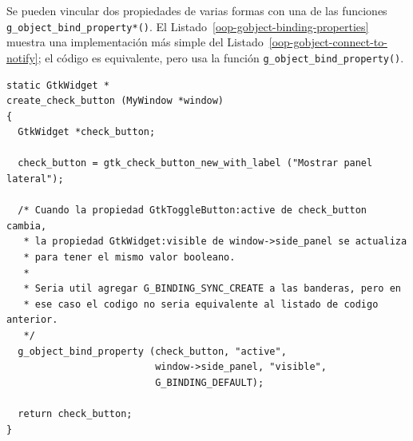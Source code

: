 Se pueden vincular dos propiedades de varias formas con una de las funciones \lstinline{g_object_bind_property*()}. El Listado~\ref{oop-gobject-binding-properties} muestra una implementación más simple del Listado~\ref{oop-gobject-connect-to-notify}; el código es equivalente, pero usa la función \lstinline{g_object_bind_property()}.

\vspace{0.7cm}
\begin{lstlisting}[style=GLib/GTK, caption={Vinculando dos propiedades.}, label=oop-gobject-binding-properties]
static GtkWidget *
create_check_button (MyWindow *window)
{
  GtkWidget *check_button;

  check_button = gtk_check_button_new_with_label ("Mostrar panel lateral");

  /* Cuando la propiedad GtkToggleButton:active de check_button cambia,
   * la propiedad GtkWidget:visible de window->side_panel se actualiza
   * para tener el mismo valor booleano.
   *
   * Seria util agregar G_BINDING_SYNC_CREATE a las banderas, pero en
   * ese caso el codigo no seria equivalente al listado de codigo anterior.
   */
  g_object_bind_property (check_button, "active",
                          window->side_panel, "visible",
                          G_BINDING_DEFAULT);

  return check_button;
}
\end{lstlisting}